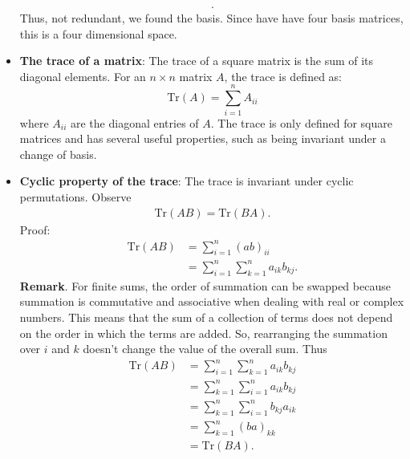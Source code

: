 \documentclass{report}
\begin{document}
\begin{itemize}
\begin{align*}
            .\end{align*}
            Thus, not redundant, we found the basis.
            \bigbreak \noindent 
            Since have have four basis matrices, this is a four dimensional space.
        \item \textbf{The trace of a matrix}: The trace of a square matrix is the sum of its diagonal elements. For an 
            $n \times n$ matrix $A$, the trace is defined as:
            \[
                \text{Tr}(A) = \sum_{i=1}^{n} A_{ii}
            \]
            where $A_{ii}$ are the diagonal entries of $A$. The trace is only defined for square matrices and has several useful properties, such as being invariant under a change of basis.
        \item \textbf{Cyclic property of the trace}: The trace is invariant under cyclic permutations. Observe
            \begin{align*}
                \text{Tr}(AB) = \text{Tr}(BA)
            .\end{align*}
            \bigbreak \noindent 
            Proof:
            \begin{align*}
                \text{Tr}(AB) &= \sum_{i=1}^{n}(ab)_{ii}  \\
                &=\sum_{i=1}^{n}\sum_{k=1}^{n}a_{ik}b_{kj}
            .\end{align*}
            \bigbreak \noindent 
            \textbf{Remark}. For finite sums, the order of summation can be swapped because summation is commutative and associative when dealing with real or complex numbers. This means that the sum of a collection of terms does not depend on the order in which the terms are added. So, rearranging the summation over $i$ and $k$ doesn't change the value of the overall sum. Thus
            \begin{align*}
                \text{Tr}(AB) &= \sum_{i=1}^{n}\sum_{k=1}^{n}a_{ik}b_{kj} \\
                              &= \sum_{k=1}^{n}\sum_{i=1}^{n}a_{ik}b_{kj} \\
                              &= \sum_{k=1}^{n}\sum_{i=1}^{n}b_{kj} a_{ik} \\
                              &= \sum_{k=1}^{n}(ba)_{kk} \\
                              &= \text{Tr}(BA)
            .\end{align*}


\end{itemize}
\end{document}
